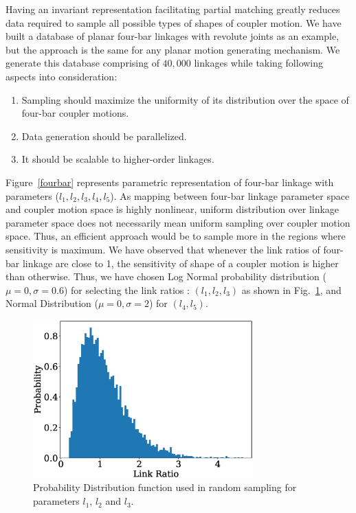 \documentclass[twocolumn,10pt]{asme2ej}
\begin{document}
Having an invariant representation facilitating partial matching greatly reduces data required to sample all possible types of shapes of coupler motion.
We have built a database of planar four-bar linkages with revolute joints as an example, but the approach is the same for any planar motion generating mechanism.
We generate this database comprising of $40,000$ linkages while taking following aspects into consideration:
\begin{enumerate}
  \item Sampling should maximize the uniformity of its distribution over the space of four-bar coupler motions.
  \item Data generation should be parallelized.
  \item It should be scalable to higher-order linkages.
\end{enumerate}
Figure~\ref{fourbar} represents parametric representation of four-bar linkage with parameters ($l_1,l_2,l_3,l_4,l_5$).
As mapping between four-bar linkage parameter space and coupler motion space is highly nonlinear, uniform distribution over linkage parameter space does not necessarily mean uniform sampling over coupler motion space.
Thus, an efficient approach would be to sample more in the regions where sensitivity is maximum.
We have observed that whenever the link ratios of four-bar linkage are close to 1, the sensitivity of shape of a coupler motion is higher than otherwise.
Thus, we have chosen Log Normal probability distribution ($\mu = 0,\sigma = 0.6 $) for selecting the link ratios : $(l_1, l_2, l_3)$ as shown in Fig.~\ref{logNormal}, and Normal Distribution ($\mu = 0,\sigma = 2 $) for $(l_4, l_5)$.

\begin{figure}
\centering
\includegraphics[width=240pt]{figure/fig_logNormal.eps}
  \caption{Probability Distribution function used in random sampling for parameters $l_1$, $l_2$ and $l_3$.}
\label{logNormal}
\end{figure}
\end{document}
